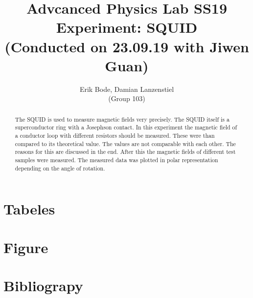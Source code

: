 \documentclass[30pt,a4paper]{article}
\title{
	\large Advcanced Physics Lab	SS19 \\[4mm]
	\textbf{\LARGE Experiment: SQUID
	} \\[4mm]
	(Conducted on 23.09.19 with Jiwen Guan) \\}
\author{Erik Bode, Damian Lanzenstiel \\ (Group 103)}
\begin{document}
	
	\begin{titlepage}
		\maketitle
		\vspace{2cm}
		\begin{abstract}
			The SQUID is used to measure magnetic fields very precisely. The SQUID itself is a superconductor ring with a Josephson contact.  In this experiment the magnetic field of a conductor loop with different resistors should be measured. These were than compared to its theoretical value. The values are not comparable with each other. The reasons for this are discussed in the end. After this the magnetic fields of different test samples were measured. The measured data was plotted in polar representation depending on the angle of rotation. 
		\end{abstract}
	\end{titlepage}
	\newpage
	\tableofcontents
	\newpage
	
	
		
	
	
	
	
	
	
	\section{Tabeles}
	\listoftables
	\section{Figure}
	\listoffigures
	\section{Bibliograpy}
	
	
\end{document}
